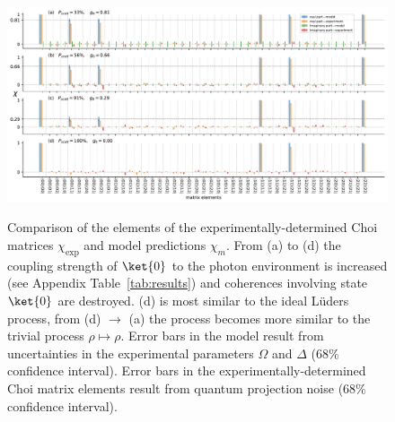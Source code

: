 \documentclass[12pt,
onecolumn,
superscriptaddress,
floatfix,
]{revtex4-2}
\begin{document}
\begin{turnpage}
\begin{figure}[h]
\centering
\includegraphics[width=\linewidth]{data+model+error.pdf}
\label{fig:exp+data}
\caption{Comparison of the elements of the experimentally-determined Choi matrices $\chi_\mathrm{exp}$ and model predictions $\chi_m$.
From (a) to (d) the coupling strength of $\ket{0}$ to the photon environment is increased (see Appendix Table~\ref{tab:results}) and coherences involving state $\ket{0}$ are destroyed.
(d) is most similar to the ideal Lüders process, from (d) $\rightarrow$ (a) the process becomes more similar to the trivial process $\rho \mapsto \rho$.
Error bars in the model result from uncertainties in the experimental parameters $\Omega$ and $\Delta$ (68\% confidence interval).
Error bars in the experimentally-determined Choi matrix elements result from quantum projection noise (68\% confidence interval).}
\end{figure}
\end{turnpage}

\end{document}
